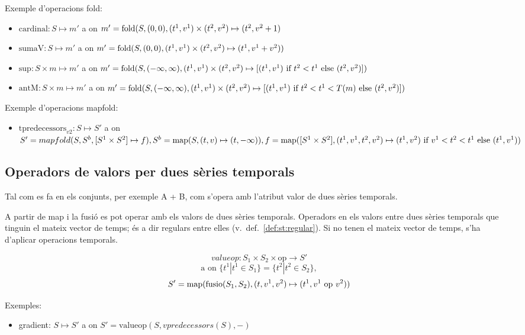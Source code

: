 Exemple d'operacions fold:
\begin{itemize}
\item $\text{cardinal}: S \mapsto m'$ a on $m'=
  \operatorname*{fold}(S,(0,0),(t^1,v^1)\times(t^2,v^2)\mapsto(t^2,v^2+1)$
\item $\text{sumaV}: S \mapsto m'$ a on $m'=
  \operatorname*{fold}(S,(0,0),(t^1,v^1)\times(t^2,v^2)\mapsto(t^1,v^1+v^2))$
\item $\text{sup}: S \times m \mapsto m'$ a on $m'=
  \operatorname*{fold}(S,(-\infty,\infty),(t^1,v^1)\times(t^2,v^2)\mapsto [(t^1,v^1)
  \text{ if } t^2 < t^1 \text{ else } (t^2,v^2) ])$
\item $\text{antM}: S \times m \mapsto m'$ a on $m'=
  \operatorname*{fold}(S,(-\infty,\infty),(t^1,v^1)\times(t^2,v^2)\mapsto [(t^1,v^1)
  \text{ if } t^2 < t^1 < T(m) \text{ else } (t^2,v^2) ])$
\end{itemize}


Exemple d'operacions mapfold:
\begin{itemize}
\item $\text{tpredecessors}_{v2}: S \mapsto S'$ a on $S'=
  mapfold(S,S^b,[S^1\times S^2]\mapsto f), S^b =
  \operatorname*{map}(S,(t,v)\mapsto(t,-\infty)), f=\operatorname*{map}([S^1\times
  S^2],(t^1,v^1,t^2,v^2)\mapsto (t^1,v^2) \text{ if } v^1<t^2<t^1
  \text{ else } (t^1,v^1))$
\end{itemize}


\subsection{Operadors de valors per dues sèries temporals}

Tal com es fa en els conjunts, per exemple A + B, com s'opera amb
l'atribut valor de dues sèries temporals.

A partir de map i la fusió es pot operar amb els valors de dues sèries
temporals.  Operadors en els valors entre dues sèries temporals que
tinguin el mateix vector de temps; és a dir regulars entre elles (v.\
def.~\ref{def:st:regular}). Si no tenen el mateix vector de temps,
s'ha d'aplicar operacions temporals. \todo{ref més endavant}

\[
valueop: S_1 \times S_2 \times \text{op} \longrightarrow S'
\]
\[
\text{a on } \{t^1|t^1\in S_1\} = \{t^2|t^2\in S_2\}, 
\]
\[
S' = \operatorname*{map}(\text{fusio}(S_1,S_2),(t,v^1,v^2)\mapsto(t^1,v^1 \text{ op } v^2))
\]



Exemples:
\begin{itemize}
\item gradient: $S \mapsto S'$ a on $S'= \text{valueop}(S,vpredecessors(S),-)$
\end{itemize}




